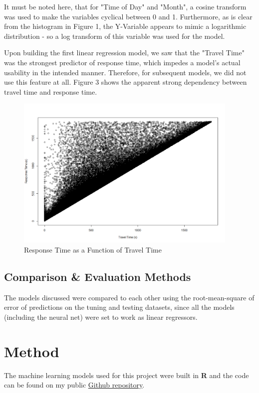 \documentclass[twoside,11pt]{article}
\begin{document}
It must be noted here, that for "Time of Day" and "Month", a cosine transform was used to make the variables cyclical between 0 and 1. Furthermore, as is clear from the histogram in Figure 1, the Y-Variable appears to mimic a logarithmic distribution - so a log transform of this variable was used for the model.

Upon building the first linear regression model, we saw that the "Travel Time" was the strongest predictor of response time, which impedes a model's actual usability in the intended manner. Therefore, for subsequent models, we did not use this feature at all.  Figure 3 shows the apparent strong dependency between travel time and response time.
\begin{figure}
    \centering
    \includegraphics[width = 0.95\textwidth]{traveltime.png}
    \caption{Response Time as a Function of Travel Time}
\end{figure}


\subsection{Comparison \& Evaluation Methods}
The models discussed were compared to each other using the root-mean-square of error of predictions on the tuning and testing datasets, since all the models (including the neural net) were set to work as linear regressors.

\section{Method}
The machine learning models used for this project were built in \textbf{R} and the code can be found on my public \href{https://github.com/acharyaprithvi/90904-project/blob/master/final_project_code.rmd}{Github repository}.
\end{document}
